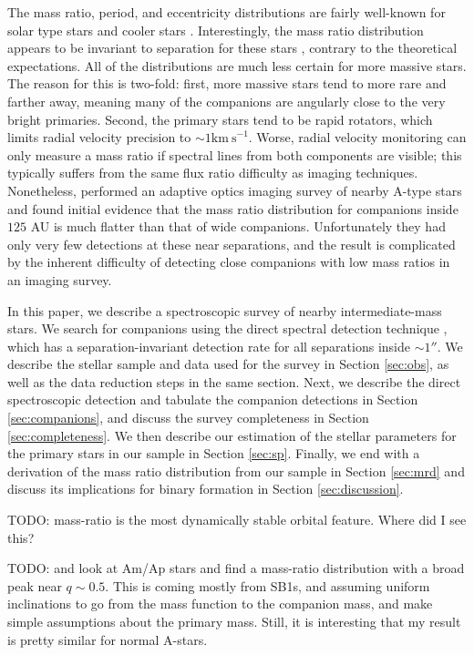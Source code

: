 \documentclass{emulateapj}
\begin{document}
The mass ratio, period, and eccentricity distributions are fairly well-known for solar type stars \citep{Duquennoy1991, Raghavan2010} and cooler stars \citep{Fischer1992, Delfosse2004}. Interestingly, the mass ratio distribution appears to be invariant to separation for these stars \citep{Meyer2013}, contrary to the theoretical expectations. All of the distributions are much less certain for more massive stars. The reason for this is two-fold: first, more massive stars tend to more rare and farther away, meaning many of the companions are angularly close to the very bright primaries. Second, the primary stars tend to be rapid rotators, which limits radial velocity precision to $\sim 1 \mathrm{km\ s}^{-1}$. Worse, radial velocity monitoring can only measure a mass ratio if spectral lines from both components are visible; this typically suffers from the same flux ratio difficulty as imaging techniques. Nonetheless, \citet{DeRosa2014} performed an adaptive optics imaging survey of nearby A-type stars and found initial evidence that the mass ratio distribution for companions inside $125$ AU is much flatter than that of wide companions. Unfortunately they had only very few detections at these near separations, and the result is complicated by the inherent difficulty of detecting close companions with low mass ratios in an imaging survey.

In this paper, we describe a spectroscopic survey of nearby intermediate-mass stars. We search for companions using the direct spectral detection technique \citep{Gullikson2016}, which has a separation-invariant detection rate for all separations inside $\sim 1 ''$. We describe the stellar sample and data used for the survey in Section \ref{sec:obs}, as well as the data reduction steps in the same section. Next, we describe the direct spectroscopic detection and tabulate the companion detections in Section \ref{sec:companions}, and discuss the survey completeness in Section \ref{sec:completeness}. We then describe our estimation of the stellar parameters for the primary stars in our sample in Section \ref{sec:sp}. Finally, we end with a derivation of the mass ratio distribution from our sample in Section \ref{sec:mrd} and discuss its implications for binary formation in Section \ref{sec:discussion}.



TODO: mass-ratio is the most dynamically stable orbital feature. Where did I see this?

TODO: \citep{Carrier2002} and \citep{Vuissoz2004} look at Am/Ap stars and find a mass-ratio distribution with a broad peak near $q \sim 0.5$. This is coming mostly from SB1s, and assuming uniform inclinations to go from the mass function to the companion mass, and make simple assumptions about the primary mass. Still, it is interesting that my result is pretty similar for normal A-stars.
\end{document}
